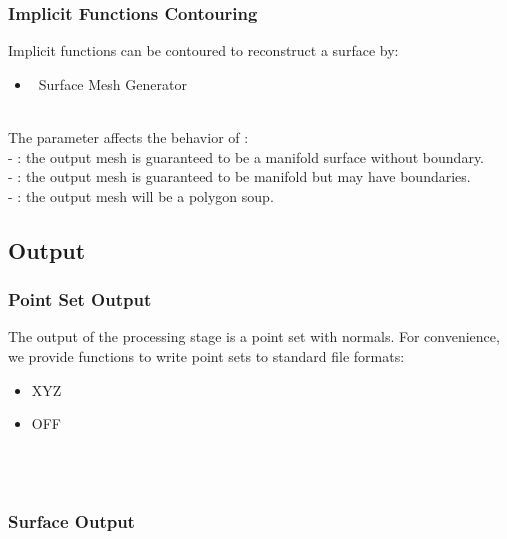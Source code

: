 \subsubsection{Implicit Functions Contouring}

Implicit functions can be contoured to reconstruct a surface by:

\begin{itemize}
\item \cgal\ Surface Mesh Generator~\cite{cgal:ry-gsddrm-06,cgal:bo-pgsms-05}
\end{itemize}

  \\

The parameter  affects the behavior of : \\
- : the output mesh is guaranteed to be a manifold
surface without boundary.\\
- : the output mesh is guaranteed to be
manifold but may have boundaries.\\
- : the output mesh will be a polygon soup.


\subsection{Output}

\subsubsection{Point Set Output}

The output of the processing stage is a point set with normals.
For convenience, we provide functions to write point sets to standard file formats:

\begin{itemize}
\item XYZ
\item OFF
\end{itemize}

  \\
  \\


\subsubsection{Surface Output}

